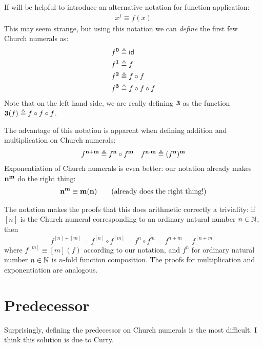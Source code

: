 If will be helpful to introduce an alternative notation for function application:
\begin{align*}
  x^f \equiv f(x)
\end{align*}
This may seem strange, but using this notation we can \emph{define} the first few Church numerals as:
\begin{align*}
  f^{\mathbf{0}} &\triangleq{} \mathsf{id}\\
  f^{\mathbf{1}} &\triangleq{} f \\
  f^{\mathbf{2}} &\triangleq{} f \circ f\\
  f^{\mathbf{3}} &\triangleq{} f \circ f \circ f
\end{align*}
Note that on the left hand side, we are really defining $\mathbf{3}$ as the function $\mathbf{3}(f) \triangleq{} f \circ f \circ f$.

The advantage of this notation is apparent when defining addition and multiplication on Church numerals:
\begin{align*}
  f^{\mathbf{n}+\mathbf{m}} \triangleq{} f^{\mathbf{n}} \circ f^{\mathbf{m}} &&
  f^{\mathbf{n}\cdot\mathbf{m}} \triangleq{} (f^{\mathbf{n}})^{\mathbf{m}}
\end{align*}
Exponentiation of Church numerals is even better: our notation already makes $\mathbf{n}^{\mathbf{m}}$ do the right thing:
\begin{align*}
  \mathbf{n}^{\mathbf{m}} \equiv \mathbf{m}(\mathbf{n}) \tag{already does the right thing!}
\end{align*}

The notation makes the proofs that this does arithmetic correctly a triviality: if $[n]$ is the Church numeral corresponding to an ordinary natural number $n \in \mathbb{N}$, then
\begin{align*}
  f^{[n]+[m]} = f^{[n]} \circ f^{[m]} = f^n \circ f^m = f^{n+m} = f^{[n+m]}
\end{align*}
where $f^{[m]} \equiv [m](f)$ according to our notation, and $f^n$ for ordinary natural number $n \in \mathbb{N}$ is $n$-fold function composition.
The proofs for multiplication and exponentiation are analogous.

\section{Predecessor}
Surprisingly, defining the predecessor on Church numerals is the most difficult. I think this solution is due to Curry.

